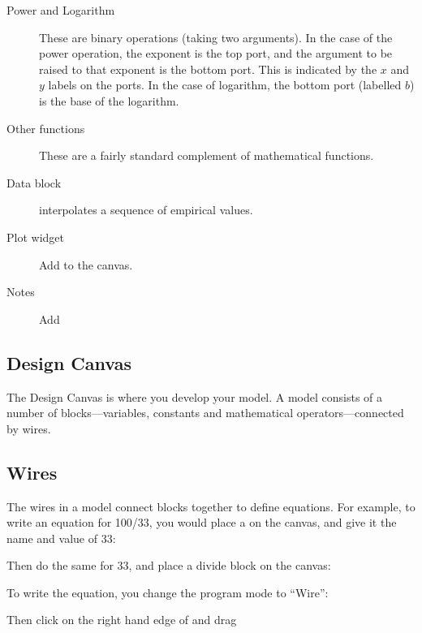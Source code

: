 \begin{description}
\item[Power and Logarithm] These are binary operations (taking two
arguments). In the case of the power operation, the exponent is the
top port, and the argument to be raised to that exponent is the bottom
port. This is indicated by the $x$ and $y$ labels on the ports. In the
case of logarithm, the bottom port (labelled $b$) is the base of the
logarithm.  

\item[Other functions] These are a fairly standard
complement of mathematical functions.  

\item[Data block]  interpolates a
sequence of empirical values.

\item[Plot widget] Add  to the canvas.

\item[Notes] Add 

\end{description}

\subsection{Design Canvas}
\label{DesignCanvas}

The Design Canvas is where you develop your model. A model consists of
a number of blocks---variables, constants and mathematical
operators---connected by wires. 


\subsection{Wires}
\label{Wires}

The wires in a model connect blocks together to define equations. For
example, to write an equation for 100/33, you would place a
 on the canvas, and give it the name and value of 33:


Then do the same for 33, and place a divide block on the canvas:


To write the equation, you change the program mode to ``Wire'':



Then click on the right hand edge of 
and drag 

